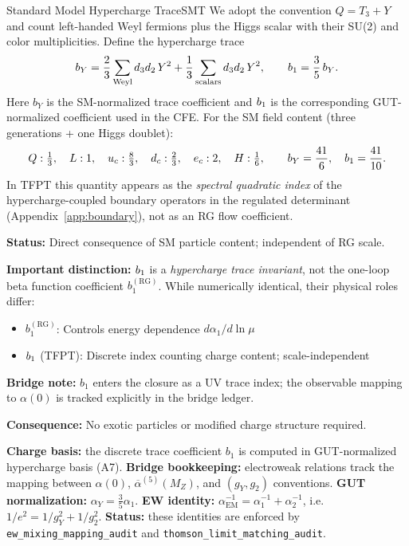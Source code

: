 \begin{axiom}{Standard Model Hypercharge Trace}{SMT}
We adopt the convention $Q=T_3+Y$ and count left-handed Weyl fermions plus the Higgs
scalar with their SU(2) and color multiplicities. Define the hypercharge trace
\begin{equation}
    b_Y = \frac{2}{3}\sum_{\text{Weyl}} d_3 d_2\,Y^2
    + \frac{1}{3}\sum_{\text{scalars}} d_3 d_2\,Y^2,
    \qquad
    b_1 = \frac{3}{5}\,b_Y.
\end{equation}
Here $b_Y$ is the SM-normalized trace coefficient and $b_1$ is the corresponding
GUT-normalized coefficient used in the CFE.
For the SM field content (three generations + one Higgs doublet):
\begin{equation}
    Q:\tfrac{1}{3},\quad L:1,\quad u_c:\tfrac{8}{3},\quad d_c:\tfrac{2}{3},\quad e_c:2,\quad H:\tfrac{1}{6},
    \qquad b_Y=\frac{41}{6},\quad b_1=\frac{41}{10}.
\end{equation}
In TFPT this quantity appears as the \emph{spectral quadratic index} of the
hypercharge-coupled boundary operators in the regulated determinant
(Appendix~\ref{app:boundary}), not as an RG flow coefficient.

\tcblower
\textbf{Status:} Direct consequence of SM particle content; independent of RG scale.

\textbf{Important distinction:} $b_1$ is a \emph{hypercharge trace invariant}, 
not the one-loop beta function coefficient $b_1^{(\text{RG})}$. While numerically 
identical, their physical roles differ:
\begin{itemize}[leftmargin=1.5em, topsep=2pt, itemsep=1pt]
    \item $b_1^{(\text{RG})}$: Controls energy dependence $d\alpha_1/d\ln\mu$
    \item $b_1$ (TFPT): Discrete index counting charge content; scale-independent
\end{itemize}
\textbf{Bridge note:} $b_1$ enters the closure as a UV trace index; the observable mapping to $\alpha(0)$ is tracked explicitly in the bridge ledger.

\textbf{Consequence:} No exotic particles or modified charge structure required.
\end{axiom}

\begin{tcolorbox}[colback=yellow!3, colframe=yellow!60!black,
    title={\textbf{EW mapping (kernel $\alpha$ vs. observable $\alpha_{\mathrm{EM}}$)}}, fonttitle=\bfseries\small]
\textbf{Charge basis:} the discrete trace coefficient $b_1$ is computed in GUT-normalized hypercharge basis (A7).
\textbf{Bridge bookkeeping:} electroweak relations track the mapping between $\alpha(0)$, $\overline{\alpha}^{(5)}(M_Z)$, and $(g_Y,g_2)$ conventions.
\textbf{GUT normalization:} $\alpha_Y = \tfrac{3}{5}\alpha_1$.
\textbf{EW identity:} $\alpha_{\mathrm{EM}}^{-1} = \alpha_1^{-1} + \alpha_2^{-1}$, i.e.\ $1/e^2=1/g_Y^2+1/g_2^2$.
\textbf{Status:} these identities are enforced by \texttt{ew\_mixing\_mapping\_audit} and \texttt{thomson\_limit\_matching\_audit}.
\end{tcolorbox}

